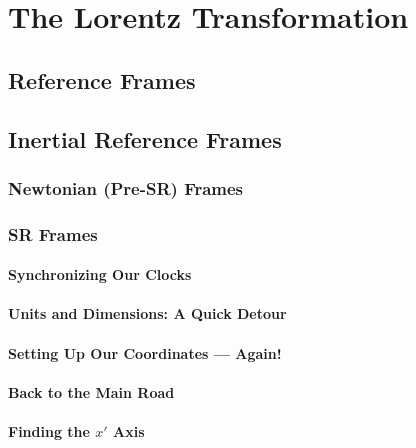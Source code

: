 \documentclass[a4paper]{article}
\newcommand{\vtitle}{Special Relativity and Classical Field Theory}
\begin{document}
\maketitle
\begin{abstract}
Below are solution proposals to the exercises of
\textit{The Theoretical Minimum - \vtitle{}}, written
by Leonard Susskind and Art Friedman. An effort has been
so as to recall from the book all the referenced equations,
and to be rather verbose regarding mathematical details,
hopefully in line with the general tone of the series.
\end{abstract}

\tableofcontents

\section{The Lorentz Transformation}
\subsection{Reference Frames}
\subsection{Inertial Reference Frames}
\subsubsection{Newtonian (Pre-SR) Frames}

\subsubsection{SR Frames}
\paragraph{Synchronizing Our Clocks}
\paragraph{Units and Dimensions: A Quick Detour}
\paragraph{Setting Up Our Coordinates --- Again!}
\paragraph{Back to the Main Road}
\paragraph{Finding the $x'$ Axis}
\end{document}
